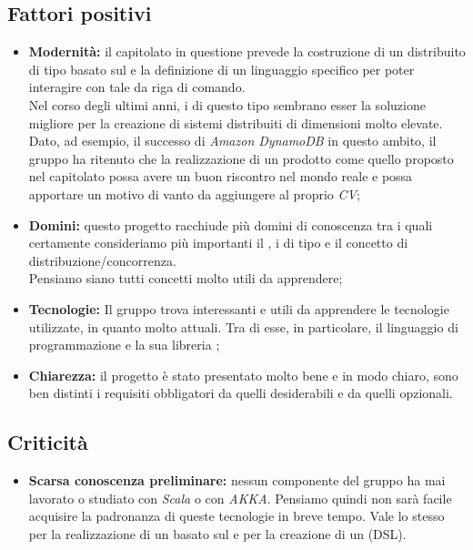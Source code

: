 \documentclass{scalatekids-article}
\begin{document}
\subsection{Fattori positivi}
\begin{itemize}
\item \textbf{Modernità:} il capitolato in questione prevede la costruzione di un   distribuito di tipo  basato sul  e la definizione di un linguaggio specifico per poter interagire con tale  da riga di comando.\\
  Nel corso degli ultimi anni, i  di questo tipo sembrano esser la soluzione migliore per la creazione di sistemi distribuiti di dimensioni molto elevate. Dato, ad esempio, il successo di \textit{Amazon DynamoDB} in questo ambito, il gruppo ha ritenuto che la realizzazione di un prodotto come quello proposto nel capitolato possa avere un buon riscontro nel mondo reale e possa apportare un motivo di vanto da aggiungere al proprio \textit{CV};
\item \textbf{Domini:} questo progetto racchiude più domini di conoscenza tra i quali certamente consideriamo più importanti il , i   di tipo  e il concetto di distribuzione/concorrenza. \\
  Pensiamo siano tutti concetti molto utili da apprendere;
\item \textbf{Tecnologie:} Il gruppo trova interessanti e utili da apprendere le tecnologie utilizzate, in quanto molto attuali. Tra di esse, in particolare, il linguaggio di programmazione \textit{} e la sua libreria \textit{};
\item \textbf{Chiarezza:} il progetto è stato presentato molto bene e in modo chiaro, sono ben distinti i requisiti obbligatori da quelli desiderabili e da quelli opzionali.
\end{itemize}
\subsection{Criticità}
\begin{itemize}
\item \textbf{Scarsa conoscenza preliminare:} nessun componente del gruppo ha mai lavorato o studiato con \textit{Scala} o con \textit{AKKA}. Pensiamo quindi non sarà facile acquisire la padronanza di queste tecnologie in breve tempo.
  Vale lo stesso per la realizzazione di un  basato sul  e per la creazione di un (DSL).
\end{itemize}
\end{document}
